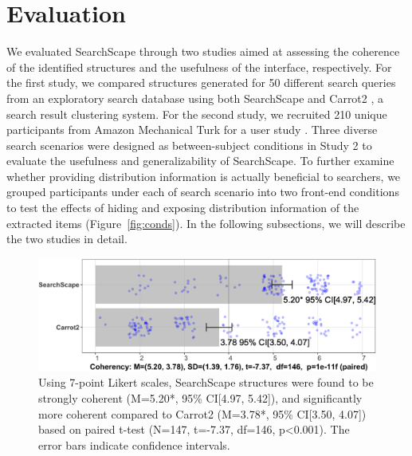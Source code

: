 \section{Evaluation}



We evaluated SearchScape through two studies aimed at assessing the coherence of the identified structures and the usefulness of the interface, respectively. For the first study, we compared structures generated for 50 different search queries from an exploratory search database \cite{potthast2013exploratory,Hagen:2016:WSA:2854946.2854969} using both SearchScape and Carrot2 \cite{stefanowski2003carrot}, a search result clustering system.
For the second study, we recruited 210 unique participants from Amazon Mechanical Turk for a user study \cite{kittur2008crowdsourcing}.
Three diverse search scenarios were designed as between-subject conditions in Study 2 to evaluate the usefulness and generalizability of SearchScape. 
To further examine whether providing distribution information is actually beneficial to searchers,
we grouped participants under each of search scenario into two front-end conditions to test the effects of hiding and exposing distribution information of the extracted items (Figure~\ref{fig:conds}). In the following subsections, we will describe the two studies in detail.

\begin{figure}
    \centering
    \includegraphics[width=0.6\columnwidth]{Chapters/SearchScape/figures/coherence_label.png}
    \caption[SearchScape structures were found to be strongly coherent, and significantly more coherent compared to Carrot2 based on paired t-test.]{Using 7-point Likert scales,  
    SearchScape structures were found to be strongly coherent (M=5.20*, 95\% CI[4.97, 5.42]), and significantly more coherent compared to Carrot2 (M=3.78*, 95\% CI[3.50, 4.07]) based on paired t-test (N=147, t=-7.37, df=146, p<0.001). The error bars indicate confidence intervals.
        }
    \label{fig:coherence}
\end{figure}

